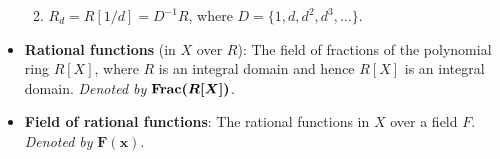 \documentclass[../notes.tex]{subfiles}
\begin{document}
\begin{itemize}
\begin{enumerate}
\begin{itemize}
\begin{itemize}
            \end{itemize}
        \end{itemize}
        \item $R_d=R[1/d]=D^{-1}R$, where $D=\{1,d,d^2,d^3,\dots\}$.
    \end{enumerate}
    \item \textbf{Rational functions} (in $X$ over $R$): The field of fractions of the polynomial ring $R[X]$, where $R$ is an integral domain and hence $R[X]$ is an integral domain. \emph{Denoted by} $\bm{\Frac(R[X])}$.
    \item \textbf{Field of rational functions}: The rational functions in $X$ over a field $F$. \emph{Denoted by} $\bm{F(x)}$.
\end{itemize}
\end{document}
